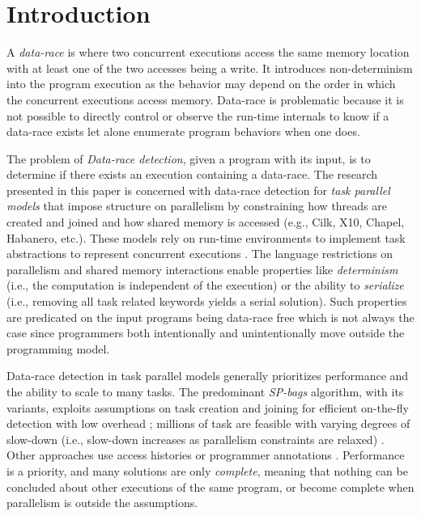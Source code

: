 \section{Introduction}
A \emph{data-race} is where two concurrent executions access the same memory location with at least one of the two accesses being a write. It introduces non-determinism into the program execution as the behavior may depend on the order in which the concurrent executions access memory. Data-race is problematic because it is not possible to directly control or observe the run-time internals to know if a data-race exists let alone enumerate program behaviors when one does. 

The problem of \emph{Data-race detection}, given a program with its input, is to determine if there exists an execution containing a data-race. The research presented in this paper is concerned with data-race detection for \emph{task parallel models} that impose structure on parallelism by constraining how threads are created and joined and how shared memory is accessed (e.g., Cilk, X10, Chapel, Habanero, etc.). These models rely on run-time environments to implement task abstractions to represent concurrent executions \cite{blumofe1996cilk,charles2005x10,cave2011habanero,imam2014habanero}. The language restrictions on parallelism and shared memory interactions enable properties like \emph{determinism} (i.e., the computation is independent of the execution) or the ability to \emph{serialize} (i.e., removing all task related keywords yields a serial solution). Such properties are predicated on the input programs being data-race free which is not always the case since programmers both intentionally and unintentionally move outside the programming model.

Data-race detection in task parallel models generally prioritizes performance and the ability to scale to many tasks. The predominant \emph{SP-bags} algorithm, with its variants, exploits assumptions on task creation and joining for efficient on-the-fly detection with low overhead \cite{Feng1997EDD258492258493,Cheng1998DDR277651277696,Bender2004OMS10079121007933,Async-Finish-Race,Utterback2016PGP29357642935801}; millions of task are feasible with varying degrees of slow-down (i.e., slow-down increases as parallelism constraints are relaxed) \cite{drdForFutures,Surendran2016}. Other approaches use access histories \cite{mellor1991fly,raman2012scalable} or programmer annotations \cite{westbrook2012practical, westbrook2012permission}.
Performance is a priority, and many solutions are only \emph{complete}, meaning that nothing can be concluded about other executions of the same program, or become complete when parallelism is outside the assumptions.

